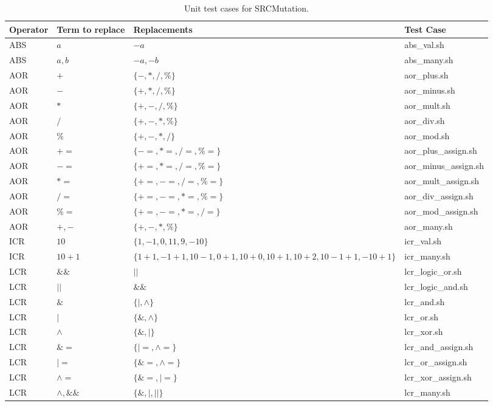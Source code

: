 
\begin{table}[h]
\scriptsize
\centering
\caption{Unit test cases for SRCMutation.}
\label{table:matrix}

\begin{tabular}{|llp{6cm}l|}
\hline 
\textbf{Operator}	&	\textbf{Term to replace}	&	\textbf{Replacements}	&	\textbf{Test Case} \\
\hline 
ABS	&	$a$	&	$-a$	&	abs\_val.sh \\
ABS	&	$a,b$	&	$-a,-b$	&	abs\_many.sh \\
AOR	&	$+$	&	$\{-,*,/,\%\}$	&	aor\_plus.sh \\
AOR	&	$-$	&	$\{+,*,/,\%\}$	&	aor\_minus.sh \\
AOR	&	$*$	&	$\{+,-,/,\%\}$	&	aor\_mult.sh \\
AOR	&	$/$	&	$\{+,-,*,\%\}$	&	aor\_div.sh \\
AOR	&	$\%$	&	$\{+,-,*,/\}$	&	aor\_mod.sh \\
AOR	&	$+=$	&	$\{-=,*=,/=,\%=\}$	&	aor\_plus\_assign.sh \\
AOR	&	$-=$	&	$\{+=,*=,/=,\%=\}$	&	aor\_minus\_assign.sh \\
AOR	&	$*=$	&	$\{+=,-=,/=,\%=\}$	&	aor\_mult\_assign.sh \\
AOR	&	$/=$	&	$\{+=,-=,*=,\%=\}$	&	aor\_div\_assign.sh \\
AOR	&	$\%=$	&	$\{+=,-=,*=,/=\}$	&	aor\_mod\_assign.sh \\
AOR	&	$+,-$	&	$\{+,-,*,\%\}$	&	aor\_many.sh \\
ICR	&	$10$	&	$\{1, -1, 0, 11, 9, -10\}$	&	icr\_val.sh \\
ICR	&	$10 + 1$	&	$\{1+1, -1+1, 10-1, 0+1, 10+0, 10+1, 10+2, 10-1+1, -10+1\}$	&	icr\_many.sh \\
LCR	&	$\&\&$	&	$||$	&	lcr\_logic\_or.sh \\
LCR	&	$||$	&	$\&\&$	&	lcr\_logic\_and.sh \\
LCR	&	$\&$	&	$\{|,\land\}$	&	lcr\_and.sh \\
LCR	&	$|$	&	$\{\&,\land\}$	&	lcr\_or.sh \\
LCR	&	$\land$	&	$\{\&,|\}$	&	lcr\_xor.sh \\
LCR	&	$\&=$	&	$\{|=, \land=\}$	&	lcr\_and\_assign.sh \\
LCR	&	$|=$	&	$\{\&=, \land=\}$	&	lcr\_or\_assign.sh \\
LCR	&	$\land=$	&	$\{\&=, |=\}$	&	lcr\_xor\_assign.sh \\
LCR	&	$\land, \&\&$	&	$\{\&,|,||\}$	&	lcr\_many.sh \\

\end{tabular}
\end{table}
